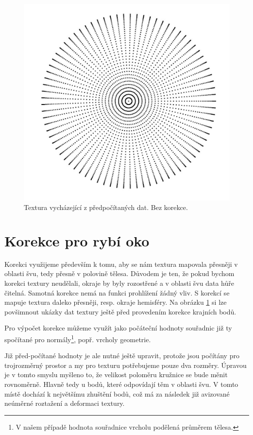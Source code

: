 \begin{figure}[h]
	\label{img:texture_without_correction}
	\centering
	\includegraphics[scale=1.0,angle=0,width=0.6\linewidth]{obrazky-figures/texture}
	\caption{Textura vycházející z předpočítaných dat. Bez korekce.}
\end{figure}

\section{Korekce pro rybí oko}
Korekci využijeme především k tomu, aby se nám textura mapovala přesněji v oblasti švu, tedy přesně v polovině tělesa. Důvodem je ten, že pokud bychom korekci textury neudělali, okraje by byly rozostřené  a v oblasti švu data hůře čitelná.  Samotná korekce nemá na funkci prohlížení žádný vliv.
S korekcí se mapuje textura daleko přesněji, resp. okraje hemisféry. Na obrázku \ref{img:texture_without_correction} si lze povšimnout ukázky dat textury ještě před provedením korekce krajních bodů.

Pro výpočet korekce můžeme využít jako počáteční hodnoty souřadnic již ty spočítané pro normály\footnote{V našem případě hodnota souřadnice vrcholu podělená průměrem tělesa.}, popř. vrcholy geometrie.

Již před-počítané hodnoty je ale nutné ještě upravit, protože jsou počítány pro trojrozměrný prostor a my pro texturu potřebujeme pouze dva rozměry. Úpravou je v tomto smyslu myšleno to, že velikost poloměru  kružnice se bude měnit rovnoměrně. Hlavně tedy u bodů, které odpovídají těm v oblasti švu. V tomto místě dochází k největšímu zhuštění bodů, což má za následek již avizované neúměrné roztažení a deformaci textury.

\newpage




